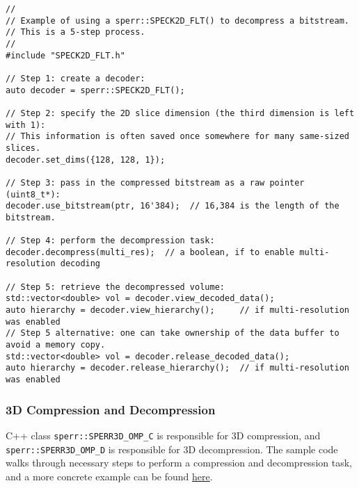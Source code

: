 \documentclass{article}
\begin{document}
\begin{verbatim}
//
// Example of using a sperr::SPECK2D_FLT() to decompress a bitstream.
// This is a 5-step process.
//
#include "SPECK2D_FLT.h"

// Step 1: create a decoder:
auto decoder = sperr::SPECK2D_FLT();

// Step 2: specify the 2D slice dimension (the third dimension is left with 1):
// This information is often saved once somewhere for many same-sized slices.
decoder.set_dims({128, 128, 1});

// Step 3: pass in the compressed bitstream as a raw pointer (uint8_t*):
decoder.use_bitstream(ptr, 16'384);  // 16,384 is the length of the bitstream.

// Step 4: perform the decompression task:
decoder.decompress(multi_res);  // a boolean, if to enable multi-resolution decoding

// Step 5: retrieve the decompressed volume:
std::vector<double> vol = decoder.view_decoded_data();
auto hierarchy = decoder.view_hierarchy();     // if multi-resolution was enabled
// Step 5 alternative: one can take ownership of the data buffer to avoid a memory copy.
std::vector<double> vol = decoder.release_decoded_data();
auto hierarchy = decoder.release_hierarchy();  // if multi-resolution was enabled
\end{verbatim}

\subsubsection{3D Compression and Decompression}
C++ class \texttt{sperr::SPERR3D\_OMP\_C} is responsible for 3D compression, and 
\texttt{sperr::SPERR3D\_OMP\_D} is responsible for 3D decompression.
The sample code walks through necessary steps to perform a compression and decompression
task, and a more concrete example can be found
\href{https://github.com/NCAR/SPERR/blob/main/utilities/sperr3d.cpp}{here}.
\end{document}
